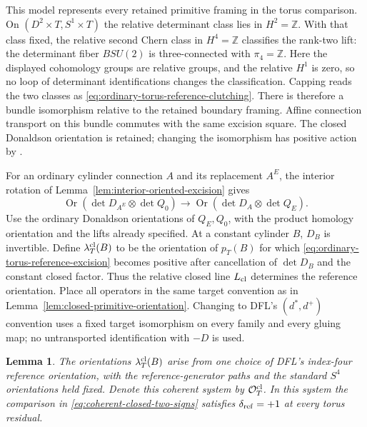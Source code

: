\documentclass[11pt]{amsart}
\newtheorem{lemma}[theorem]{Lemma}
\theoremstyle{definition}
\theoremstyle{remark}
\theoremstyle{plain}
\begin{document}
This model represents every retained primitive
framing in the torus comparison. On
$(D^2\times T,S^1\times T)$ the relative
determinant class lies in $H^2=\mathbb Z$.
With that class fixed, the relative second
Chern class in $H^4=\mathbb Z$ classifies
the rank-two lift: the determinant fiber
$BSU(2)$ is three-connected with $\pi_4=\mathbb Z$.
Here the displayed cohomology groups are
relative groups, and the relative $H^1$ is
zero, so no loop of determinant identifications
changes the classification. Capping reads
the two classes as
\eqref{eq:ordinary-torus-reference-clutching}.
There is therefore a bundle isomorphism
relative to the retained boundary framing.
Affine connection transport on this bundle
commutes with the same excision square.
The closed Donaldson orientation is retained;
changing the isomorphism has positive action
by \cite[Corollary~3.27]{Donaldson87}.

For an ordinary cylinder connection $A$ and its replacement
$A^E$, the interior rotation of
Lemma~\ref{lem:interior-oriented-excision} gives
\begin{equation}\label{eq:ordinary-torus-reference-excision}
 \operatorname{Or}(\det D_{A^E}\otimes\det Q_0)
       \longrightarrow
 \operatorname{Or}(\det D_A\otimes\det Q_E).
\end{equation}
Use the ordinary Donaldson orientations of $Q_E,Q_0$,
with the product homology orientation and the lifts
already specified. At a constant cylinder $B$, $D_B$
is invertible. Define $\lambda_T^{\rm cl}(B)$ to be
the orientation of $p_T(B)$ for which
\eqref{eq:ordinary-torus-reference-excision} becomes
positive after cancellation of $\det D_B$ and the
constant closed factor. Thus the relative closed line
$L_{\rm cl}$ determines the reference orientation.
Place all operators in the same target convention
as in Lemma~\ref{lem:closed-primitive-orientation}.
Changing to DFL's $(d^*,d^+)$ convention uses a fixed
target isomorphism on every family and every gluing
map; no untransported identification with $-D$ is used.

\begin{lemma}\label{lem:closed-torus-reference-coherence}
The orientations $\lambda_T^{\rm cl}(B)$ arise from
one choice of DFL's index-four reference orientation,
with the reference-generator paths and the standard
$S^4$ orientations held fixed. Denote this coherent
system by $\mathcal O_T^{\rm cl}$.
In this system the comparison in
\eqref{eq:coherent-closed-two-signs} satisfies
$\delta_{\rm ref}=+1$ at every torus residual.
\end{lemma}
\end{document}
